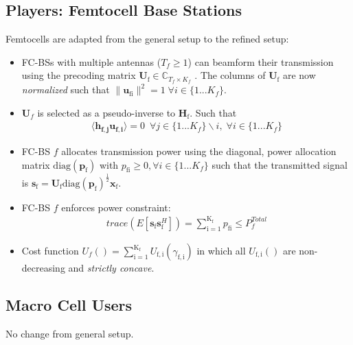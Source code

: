 \documentclass[12pt,a4paper]{report}
\begin{document}
\subsection{Players: Femtocell Base Stations}
Femtocells are adapted from the general setup to the refined setup:
\begin{itemize}
\item 
	FC-BSs with multiple antennas ($T_f \geq 1$) can beamform their transmission using the precoding 	
	matrix $\mathbf{U}_{\mathrm{f}} \in \mathbb{C}_{T_f \times K_f}$ .
	The columns of $\mathbf{U}_{\mathrm{f}}$ are now \emph{normalized} such that 
	 $\|\mathbf{u}_{\mathrm{fi}}\|^2 =1 \;\forall i \in \{1 ... K_f\}$.
\\

\item 
$\mathbf{U}_f$ is selected as a pseudo-inverse to $\mathbf{H_\mathrm{f}}$.
Such that
\begin{gather*}
\langle \mathbf{h_{f,j}}\mathbf{u_{f,i}} \rangle =0\  \; \forall j \in \{1... K_f\}\backslash i ,\; \forall i \in \{1 ... K_f\}
\end{gather*}

\item  
	FC-BS $f$ allocates  transmission power using the diagonal, power allocation  	
	matrix $\mathrm{diag}(\mathbf{p}_{\mathrm{f}})$ with $p_{\mathrm{fi}} \geq 0, \forall i \in \{1 ... K_f\}$
such that the transmitted 		
	signal is 
	$\mathbf{s}_{\mathrm{f}	}= \mathbf{U_{\mathrm{f}}} 
	\mathrm{diag}(\mathbf{p}_{\mathrm{f}})^{\frac{1}{2}}
	\mathbf{x_{\mathrm{f}}}$.
\\
\item 
	FC-BS $f$ enforces power constraint:
	\begin{gather*}
	trace(E[\mathbf{s}_\mathrm{f}\mathbf{s}_\mathrm{f}^H]) =
	\sum_{\mathrm{i=1}}^{\mathrm{K_{\mathrm{f}}}} p_{\mathrm{fi}}
	  \leq P^{Total}_{f} 
	  	\end{gather*}



\item 
	Cost function $U_f() =
	\sum_{\mathrm{i=1}}^{\mathrm{K_f}}
    	U_{\mathrm{f,i}}(\gamma_{\mathrm{f,i}}) $
    	in which all $U_{\mathrm{f,i}}()$ are non-decreasing and
    	\emph{strictly concave}.

\end{itemize}

\subsection{Macro Cell Users}
No change from general setup.
\end{document}
